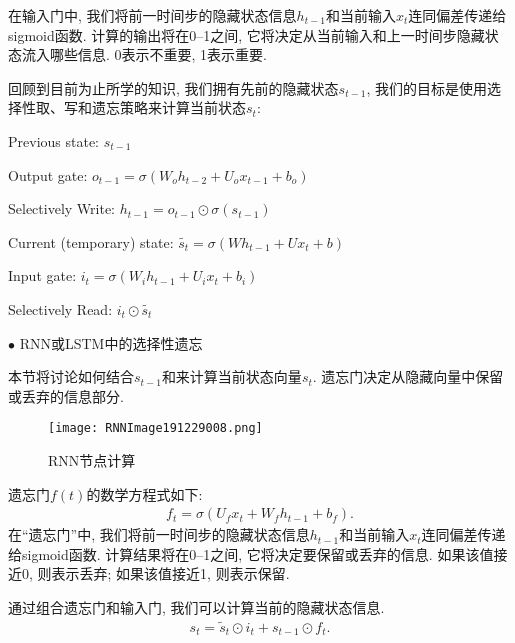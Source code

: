 \begin{example}
在输入门中, 我们将前一时间步的隐藏状态信息$h_{t-1}$和当前输入$x_t$连同偏差传递给sigmoid函数. 计算的输出将在0–1之间, 它将决定从当前输入和上一时间步隐藏状态流入哪些信息. 0表示不重要, 1表示重要.

回顾到目前为止所学的知识, 我们拥有先前的隐藏状态$s_{t-1}$, 我们的目标是使用选择性取、写和遗忘策略来计算当前状态$s_t$:

\quad Previous state: $s_{t-1}$

\quad Output gate: $o_{t-1}=\sigma\left(W_{o} h_{t-2}+U_{o} x_{t-1}+b_{o}\right)$

\quad Selectively Write: $h_{t-1}=o_{t-1} \odot \sigma\left(s_{t-1}\right)$

\quad Current (temporary) state: $\tilde{s_{t}}=\sigma\left(W h_{t-1}+U x_{t}+b\right)$

\quad Input gate: $i_{t}=\sigma\left(W_{i} h_{t-1}+U_{i} x_{t}+b_{i}\right)$

\quad Selectively Read: $i_{t} \odot \tilde{s_{t}}$
\end{example}
$\bullet$ RNN或LSTM中的选择性遗忘

本节将讨论如何结合$s_{t-1}$和来计算当前状态向量$s_t$.
遗忘门决定从隐藏向量中保留或丢弃的信息部分.
\begin{figure}[H]
\centering
\texttt{[image: RNNImage191229008.png]}
\caption{RNN节点计算}
\label{RNNImage191229008}\vspace{-0.4cm}
\end{figure}

遗忘门$f(t)$的数学方程式如下:
\begin{align}
  f_{t}=\sigma\left(U_{f} x_{t}+W_{f} h_{t-1}+b_{f}\right).
\end{align}
在“遗忘门”中, 我们将前一时间步的隐藏状态信息$h_{t-1}$和当前输入$x_t$连同偏差传递给sigmoid函数. 计算结果将在0–1之间, 它将决定要保留或丢弃的信息. 如果该值接近0, 则表示丢弃; 如果该值接近1, 则表示保留.

通过组合遗忘门和输入门, 我们可以计算当前的隐藏状态信息.
\begin{align}
    s_{t}=\tilde{s}_{t} \odot i_{t}+s_{t-1} \odot f_{t}.
\end{align}

